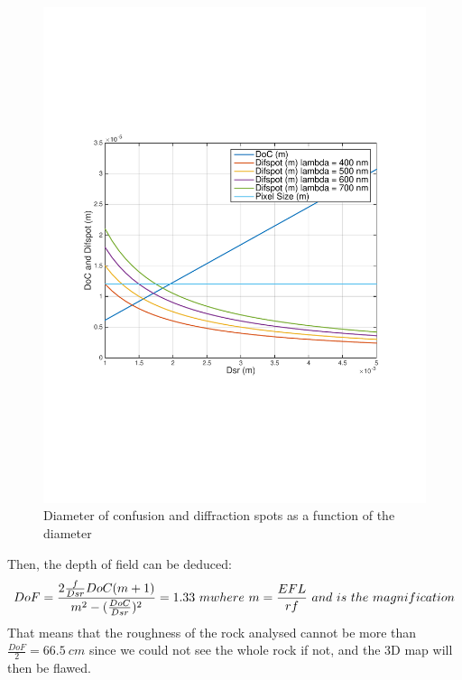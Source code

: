 \begin{figure}[H]
  \centering
  \includegraphics[trim=2cm 7cm 2cm 7cm, clip=true, totalheight=0.45\textheight, angle=0]{fig/DoCDifspot.pdf}
  \caption{Diameter of confusion and diffraction spots as a function of the diameter}
  \label{fig:DoCDifspot}
\end{figure}

Then, the depth of field can be deduced:
\begin{equation*}
DoF = \frac{2\frac{f}{Dsr}DoC(m+1)}{m^2 - (\frac{DoC}{Dsr})^2} = 1.33 \ m\\
where \ m = \frac{EFL}{rf} \ and \ is \ the \ magnification  
\end{equation*}
That means that the roughness of the rock analysed cannot be more than $\frac{DoF}{2} =  66.5\ cm$ since we could not see the whole rock if not, and the 3D map will then be flawed.